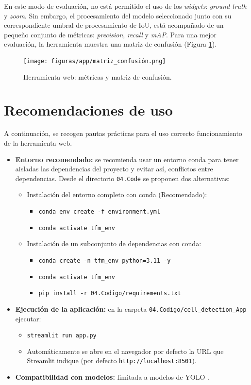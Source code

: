 \documentclass[12pt,a4paper,onecolumn,oneside]{report}
\begin{document}
En este modo de evaluación, no está permitido el uso de los \textit{widgets}: \textit{ground truth} y \textit{zoom}. Sin embargo, 
el procesamiento del modelo seleccionado junto con su correspondiente umbral de procesamiento de IoU, está acompañado de un pequeño conjunto de métricas:
\textit{precision}, \textit{recall} y \textit{mAP}. Para una mejor evaluación, la herramienta muestra una matriz de confusión (Figura \ref{fig:cell_app_metrics}).

\begin{figure}[htbp]
  \centering
  \texttt{[image: figuras/app/matriz\_confusión.png]}
  \caption{Herramienta web: métricas y matriz de confusión.}
  \label{fig:cell_app_metrics}
\end{figure}

\section{Recomendaciones de uso}
\label{sec:Recomendaciones de uso}
A continuación, se recogen pautas prácticas para el uso correcto funcionamiento de la herramienta web.

\begin{itemize}
  \item \textbf{Entorno recomendado:} se recomienda usar un entorno conda para tener aisladas las dependencias del proyecto y evitar así, conflictos entre dependencias. 
  Desde el directorio \texttt{04.Code} se proponen dos alternativas:
    \begin{itemize}
      \item Instalación del entorno completo con conda (Recomendado):
        \begin{itemize}
          \item \texttt{conda env create -f environment.yml}
          \item \texttt{conda activate tfm\_env}
        \end{itemize}
      \item Instalación de un subconjunto de dependencias con conda:
        \begin{itemize}
          \item \texttt{conda create -n tfm\_env python=3.11 -y}
          \item \texttt{conda activate tfm\_env}
          \item \texttt{pip install -r 04.Codigo/requirements.txt}
        \end{itemize}
    \end{itemize}
  \item \textbf{Ejecución de la aplicación:} en la carpeta \texttt{04.Codigo/cell\_detection\_App} ejecutar:
    \begin{itemize}
      \item \texttt{streamlit run app.py}
      \item Automáticamente se abre en el navegador por defecto la URL que Streamlit indique (por defecto \texttt{http://localhost:8501}).
    \end{itemize}
  \item \textbf{Compatibilidad con modelos:} limitada a modelos de YOLO \cite{ultralytics_models}. 
\end{itemize}
\end{document}
